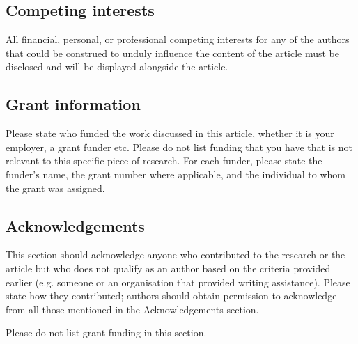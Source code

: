 \documentclass[10pt,a4paper,twocolumn]{article}
\begin{document}

\subsection*{Competing interests}
All financial, personal, or professional competing interests for any of the authors that
could be construed to unduly influence the content of the article must be disclosed and
will be displayed alongside the article.

\subsection*{Grant information}
Please state who funded the work discussed in this article, whether it is your employer,
a grant funder etc. Please do not list funding that you have that is not relevant to this
specific piece of research. For each funder, please state the funder’s name, the grant
number where applicable, and the individual to whom the grant was assigned.

\subsection*{Acknowledgements}
This section should acknowledge anyone who contributed to the research or the
article but who does not qualify as an author based on the criteria provided earlier
(e.g. someone or an organisation that provided writing assistance). Please state how
they contributed; authors should obtain permission to acknowledge from all those
mentioned in the Acknowledgements section.

Please do not list grant funding in this section.


{\small
}


\end{document}
